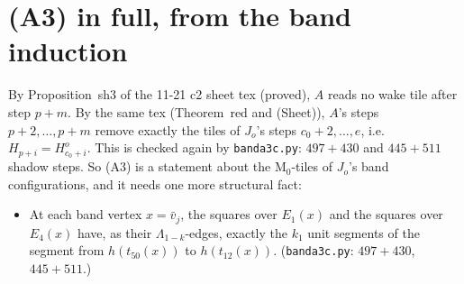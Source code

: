 \documentclass[11pt]{article}
\theoremstyle{definition}\newtheorem{definition}[theorem]{Definition}\newtheorem{remark}[theorem]{Remark}
\begin{document}
\section{(A3) in full, from the band induction}\label{sec:A3full}
By Proposition~sh3 of the 11-21 c2 sheet tex (proved), $A$ reads no wake tile after step $p+m$. By the same tex (Theorem~red and (Sheet)), $A$'s steps $p+2,\dots,p+m$ remove exactly the tiles of $J_o$'s steps $c_0+2,\dots,e$, i.e.\ $H_{p+i}=H^o_{c_0+i}$. This is checked again by \texttt{banda3c.py}: $497+430$ and $445+511$ shadow steps. So (A3) is a statement about the M$_0$-tiles of $J_o$'s band configurations, and it needs one more structural fact:
\begin{itemize}
\item[(H4)] At each band vertex $x=\bar v_j$, the squares over $E_1(x)$ and the squares over $E_4(x)$ have, as their $\Lambda_{1-k}$-edges, exactly the $k_1$ unit segments of the segment from $h(t_{50}(x))$ to $h(t_{12}(x))$. (\texttt{banda3c.py}: $497+430$, $445+511$.)
\end{itemize}
\end{document}
